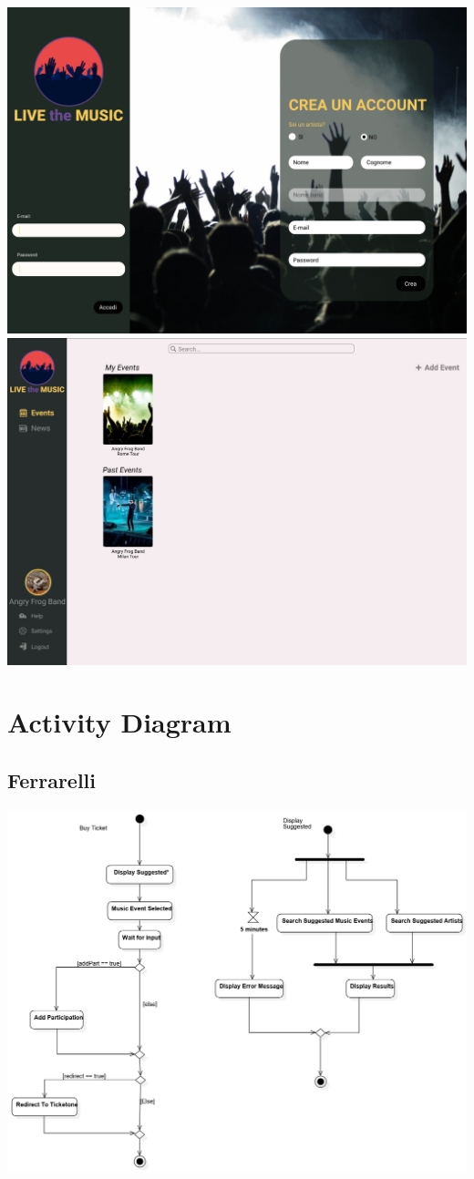 \documentclass[11pt,a4paper]{article}
\begin{document}
\includegraphics[scale=0.275]{Login.jpg}
\includegraphics[scale=0.75]{AddEvent.jpg}
\section{Activity Diagram}
\subsection{Ferrarelli}
\includegraphics[scale=0.4]{ADFerrarelli.jpg}
\end{document}
